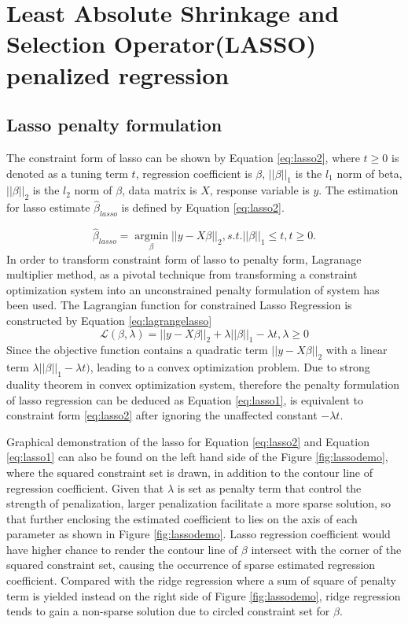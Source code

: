 \section{Least Absolute Shrinkage and Selection Operator(LASSO) penalized regression}
\subsection{Lasso penalty formulation}
The constraint form of lasso can be shown by Equation \ref{eq:lasso2}, where $t \geq 0$ is denoted as a tuning term $t$, regression coefficient is $\beta$, $||\beta||_1$ is the $l_1$ norm of beta, $||\beta||_2$ is the $l_2$ norm of $\beta$, data matrix is $X$, response variable is $y$. The estimation for lasso estimate $\hat{\beta}_{lasso}$ is defined by Equation \ref{eq:lasso2}. 

\begin{equation}
	\label{eq:lasso2}
	\hat{\beta}_{lasso} = \underset{\beta}{\operatorname{argmin}} ||y-X\beta||_2, s.t. ||\beta||_1 \leq t, t \geq 0.
\end{equation}
In order to transform constraint form of lasso to penalty form, Lagranage multiplier method, as a pivotal technique from transforming a constraint optimization system into an unconstrained penalty formulation of system has been used. The Lagrangian function for constrained Lasso Regression is constructed by Equation \ref{eq:lagrangelasso}
\begin{equation}
	\label{eq:lagrangelasso}
	\mathcal{L}(\beta,\lambda) =  ||y-X\beta||_2 + \lambda||\beta||_1 - \lambda t, \lambda \geq 0
\end{equation}
 Since the objective function contains a quadratic term $||y-X\beta||_2$ with a linear term $\lambda||\beta||_1 - \lambda t)$, leading to a convex optimization problem. Due to strong duality theorem in convex optimization system, therefore the penalty formulation of lasso regression can be deduced as Equation \ref{eq:lasso1}, is equivalent to constraint form \ref{eq:lasso2} after ignoring the unaffected constant $-\lambda t$.


Graphical demonstration of the lasso for Equation \ref{eq:lasso2} and Equation \ref{eq:lasso1} can also be found on the left hand side of the Figure \ref{fig:lassodemo}, where the squared constraint set is drawn, in addition to the contour line of regression coefficient. Given that $\lambda$ is set as penalty term that control the strength of penalization, larger penalization facilitate a more sparse solution, so that further enclosing the estimated coefficient to lies on the axis of each parameter as shown in Figure \ref{fig:lassodemo}. Lasso regression coefficient would have higher chance to render the contour line of $\beta$ intersect with the corner of the squared constraint set, causing the occurrence of sparse estimated regression coefficient. Compared with the ridge regression where a sum of square of penalty term is yielded instead on the right side of Figure \ref{fig:lassodemo}, ridge regression tends to gain a non-sparse solution due to circled constraint set for $\beta$.

